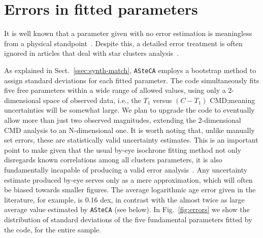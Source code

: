 \documentclass[draft]{aa}
\begin{document}

\section{Errors in fitted parameters}
\label{sec:errors-fit}

It is well known that a parameter given with no error estimation is
meaningless from a physical standpoint~\citep{Dolphin_2002,Andrae_2010}.
%
Despite this, a detailed error treatment is often ignored in
articles that deal with star clusters analysis~\citep{Paunzen_2006}.

As explained in Sect.~\ref{ssec:synth-match}, \texttt{ASteCA} employs a
bootstrap method to assign standard deviations for each fitted parameter.
%
The code simultaneously fits five free parameters within a wide range of allowed
values, using only a 2-dimensional space of observed data, i.e., the $T_1$
versus $ (C-T_1)$ CMD;\@ meaning uncertainties will be somewhat large.
We plan to upgrade the code to eventually allow more than just two observed
magnitudes, extending the 2-dimensional CMD analysis to an N-dimensional one.
%
It is worth noting that, unlike manually set errors, these are
statistically valid uncertainty estimates. This is an important point to make
given that the usual by-eye isochrone fitting method not only disregards known
correlations among all clusters parameters, it is also fundamentally incapable
of producing a valid error analysis~\citep{Naylor_2006}. Any uncertainty
estimate produced by-eye serves only as a mere approximation, which will often
be biased towards smaller figures. The average logarithmic age error given in
the literature, for example, is 0.16 dex, in contrast with the almost twice as
large average value estimated by \texttt{ASteCA} (see below).
%
In Fig.~\ref{fig:errors} we show the distribution of standard deviations
of the five fundamental parameters fitted by the code, for the entire sample.
\end{document}

